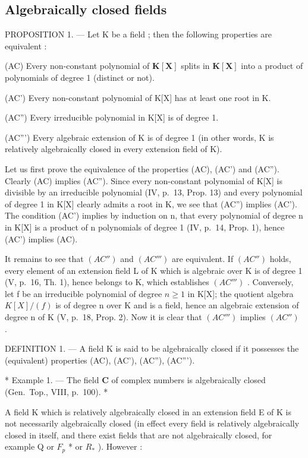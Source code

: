 \subsection{Algebraically closed fields}

PROPOSITION 1. --- Let K be a field ; then the following properties are equivalent :

(AC) Every non-constant polynomial of \(\mathbf{K}[\mathbf{X}]\) splits in \(\mathbf{K}[\mathbf{X}]\) into a product of polynomials of degree 1 (distinct or not).

(AC') Every non-constant polynomial of K{[}X{]} has at least one root in K.

(AC'') Every irreducible polynomial in K{[}X{]} is of degree 1.

(AC''') Every algebraic extension of K is of degree 1 (in other words, K is relatively algebraically closed in every extension field of K).

Let us first prove the equivalence of the properties (AC), (AC') and (AC''). Clearly (AC) implies (AC''). Since every non-constant polynomial of K{[}X{]} is divisible by an irreducible polynomial (IV, p.~13, Prop. 13) and every polynomial of degree 1 in K{[}X{]} clearly admits a root in K, we see that (AC'') implies (AC'). The condition (AC') implies by induction on n, that every polynomial of degree n in K{[}X{]} is a product of n polynomials of degree 1 (IV, p.~14, Prop. 1), hence (AC') implies (AC).

It remains to see that \((AC'')\) and \((AC''')\) are equivalent. If \((AC'')\) holds, every element of an extension field L of K which is algebraic over K is of degree 1 (V, p.~16, Th. 1), hence belongs to K, which establishes \((AC''')\) . Conversely, let f be an irreducible polynomial of degree \(n \geqslant 1\) in K{[}X{]}; the quotient algebra \(K[X]/(f)\) is of degree n over K and is a field, hence an algebraic extension of degree n of K (V, p.~18, Prop. 2). Now it is clear that \((AC''')\) implies \((AC'')\) .

DEFINITION 1. --- A field K is said to be algebraically closed if it possesses the (equivalent) properties (AC), (AC'), (AC''), (AC''').

* Example 1. --- The field \(\mathbf{C}\) of complex numbers is algebraically closed (Gen.~Top., VIII, p.~100). *

A field K which is relatively algebraically closed in an extension field E of K is not necessarily algebraically closed (in effect every field is relatively algebraically closed in itself, and there exist fields that are not algebraically closed, for example Q or \(F_{p}\) * or \(R_{*}\) ). However :

